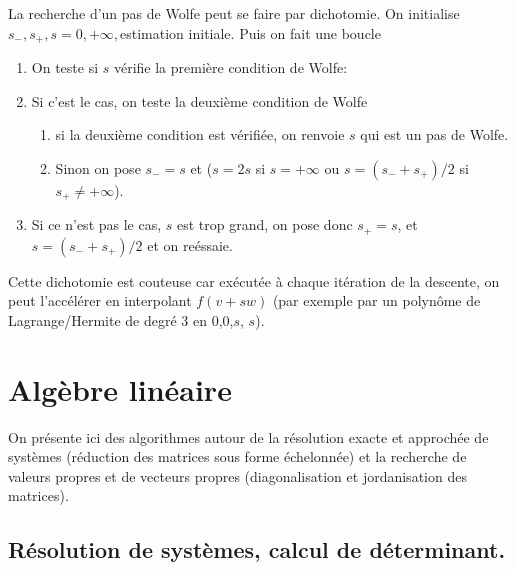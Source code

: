 \documentclass[a4paper,11pt]{book}
\begin{document}
\begin{giacjshere}
La recherche d'un pas de Wolfe peut se faire par dichotomie. On
initialise $s_-,s_+,s=0,+\infty,$estimation initiale. Puis on fait une boucle
\begin{enumerate}
\item On teste si $s$ v\'erifie la premi\`ere condition de Wolfe:
\item Si c'est le cas, on teste la deuxi\`eme condition de Wolfe
\begin{enumerate}
\item si la deuxi\`eme condition est
  v\'erifi\'ee, on renvoie $s$ qui est un pas de Wolfe. 
\item Sinon
on pose $s_-=s$
et ($s=2s$ si $s=+\infty$ ou $s=(s_-+s_+)/2$ si $s_+\neq +\infty$).
\end{enumerate}
\item Si ce n'est pas le cas, $s$ est trop
grand, on pose donc $s_+=s$, et $s=(s_-+s_+)/2$ et on re\'essaie.
\end{enumerate}
Cette dichotomie est couteuse car ex\'ecut\'ee \`a chaque it\'eration
de la descente, on peut l'acc\'el\'erer en interpolant $f(v+sw)$ (par
exemple par un polyn\^ome de Lagrange/Hermite de degr\'e 3 en 0,0,$s$, $s$).

\chapter{Alg\`ebre lin\'eaire} \label{sec:linalg}
On présente ici des algorithmes autour de la résolution exacte
et approch\'ee de systèmes (réduction des matrices sous forme échelonnée) 
et la recherche de valeurs propres et de vecteurs propres 
(diagonalisation et jordanisation des matrices).

\section{R\'esolution de syst\`emes, calcul de d\'eterminant.}


\end{giacjshere}
\end{document}
